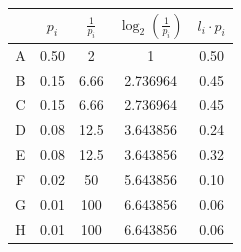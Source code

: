 \begin{table}[htbp]
    \centering
    \begin{tabular}{c c c c c}
        \toprule
        & $p_i$ & $\frac{1}{p_i}$ & $\log_2 \left(\frac{1}{p_i}\right)$ & $l_i\cdot p_i$ \\
        \midrule
        A & 0.50 & 2 & 1 & 0.50 \\
        B & 0.15 & 6.66 & 2.736964 & 0.45 \\
        C & 0.15 & 6.66 & 2.736964 & 0.45 \\
        D & 0.08 & 12.5 & 3.643856 & 0.24 \\
        E & 0.08 & 12.5 & 3.643856 & 0.32 \\
        F & 0.02 & 50 & 5.643856 & 0.10 \\
        G & 0.01 & 100 & 6.643856 & 0.06 \\
        H & 0.01 & 100 & 6.643856 & 0.06 \\
        \bottomrule
    \end{tabular}
\end{table}